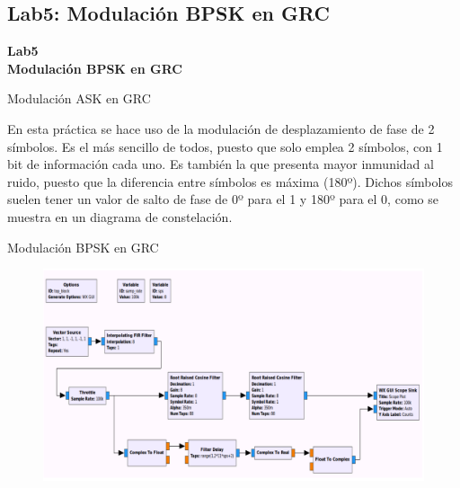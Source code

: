 \subsection{Lab5: Modulación BPSK en GRC}

\begin{frame}{}


\bfseries{\textrm{\LARGE Lab5\\ \Large Modulación BPSK en GRC}}
\raggedright
\end{frame}


\begin{frame}{Modulación ASK en GRC}




En esta práctica se hace uso de la modulación de desplazamiento de fase de 2 símbolos. Es el más sencillo de todos, puesto que solo emplea 2 símbolos, con 1 bit de información cada uno. Es también la que presenta mayor inmunidad al ruido, puesto que la diferencia entre símbolos es máxima (180º). Dichos símbolos suelen tener un valor de salto de fase de 0º para el 1 y 180º para el 0, como se muestra en un diagrama de constelación.
  

\end{frame}

\begin{frame}{Modulación BPSK en GRC}

\begin{figure}
  \centering
   \includegraphics[width=\textwidth]{parte1/lab5/pdf/lab5_1.pdf}
  \end{figure}
  
\end{frame}

